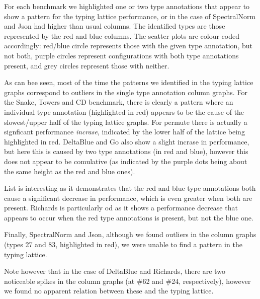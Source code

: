 \documentclass[sigplan,10pt,review,screen]{acmart}\settopmatter{printfolios=true}
\begin{document}
For each benchmark we highlighted one or two type annotations that appear to show a pattern for the typing lattice performance, or in the case of SpectralNorm and Json had higher than usual columns. The identified types are those represented by the red and blue columns. The scatter plots are colour coded accordingly: red/blue circle represents those with the given type annotation, but not both, purple circles represent configurations with both type annotations present, and grey circles represent those with neither.

As can bee seen, most of the time the patterns we identified in the typing lattice graphs correspond to outliers in the single type annotation column graphs. For the Snake, Towers and CD benchmark, there is clearly a pattern where an individual type annotation (highlighted in red) appears to be the cause of the slowest/upper half of the typing lattice graphs. For permute there is actually a signficant performance \emph{incrase}, indicated by the lower half of the lattice being highlighted in red. DeltaBlue and Go also show a slight incrase in performance, but here this is caused by two type annotations (in red and blue), however this does not appear to be comulative (as indicated by the purple dots being about the same height as the red and blue ones).

List is interesting as it demonstrates that the red and blue type annotations both cause a significant decrease in performance, which is even greater when both are present. Richards is particularly od as it shows a performance decrease that appears to occur when the red type annotations is present, but not the blue one.

Finally, SpectralNorm and Json, although we found outliers in the column graphs (types 27 and 83, highlighted in red), we were unable to find a pattern in the typing lattice. 

Note however that in the case of DeltaBlue and Richards, there are two noticeable spikes in the column graphs (at \#62 and \#24, respectively), however we found no apparent relation between these and the typing lattice.
\end{document}
